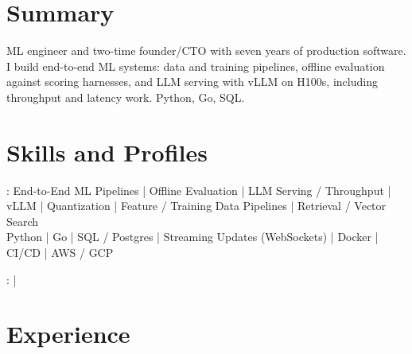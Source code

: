 \documentclass[print]{jack-resume}
\begin{document}
\pagecolor{darkmodeBackground}


\begin{minipage}[t][1cm][t]{.03\textwidth}
    \hfill
\end{minipage}

\section{Summary}
ML engineer and two-time founder/CTO with seven years of production software. I build end-to-end ML systems: data and training pipelines, offline evaluation against scoring harnesses, and LLM serving with vLLM on H100s, including throughput and latency work. Python, Go, SQL.
\sectionsep

\section{Skills and Profiles}
:
End-to-End ML Pipelines \hfill | \hfill
Offline Evaluation \hfill | \hfill
LLM Serving / Throughput \hfill | \hfill
vLLM \hfill | \hfill
Quantization \hfill | \hfill
Feature / Training Data Pipelines \hfill | \hfill
Retrieval / Vector Search \\
\hspace{1.0cm} Python \hfill | \hfill
Go \hfill | \hfill
SQL / Postgres \hfill | \hfill
Streaming Updates (WebSockets) \hfill | \hfill
Docker \hfill | \hfill
CI/CD \hfill | \hfill
AWS / GCP \\

\raggedright{
    :
      \href{https://www.linkedin.com/in/jack-sturtevant/}{ \ExternalLink} |
     \href{https://github.com/jacksturt}{ \ExternalLink}}

\section{Experience}
\end{document}
